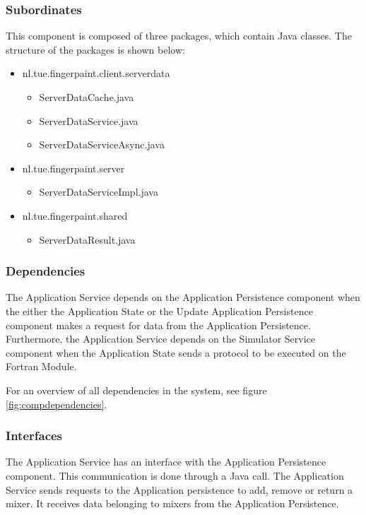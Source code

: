 \subsubsection*{Subordinates}
This component is composed of three packages, which contain Java classes. The structure of the packages is shown below:
\begin{itemize}
	\item nl.tue.fingerpaint.client.serverdata
		\begin{itemize}
			\item ServerDataCache.java
			\item ServerDataService.java
			\item ServerDataServiceAsync.java
		\end{itemize}
	
	\item nl.tue.fingerpaint.server
		\begin{itemize}
			\item ServerDataServiceImpl.java
		\end{itemize}
	
	\item nl.tue.fingerpaint.shared
		\begin{itemize}
			\item ServerDataResult.java
		\end{itemize}
\end{itemize}

\subsubsection*{Dependencies}
The Application Service depends on the Application Persistence component when the either the Application State or the Update Application Persistence component makes a request for data from the Application Persistence. Furthermore, the Application Service depends on the Simulator Service component when the Application State sends a protocol to be executed on the Fortran Module.

\fpstartparagraph{} For an overview of all dependencies in the system, see figure \ref{fig:compdependencies}.

\subsubsection*{Interfaces}
The Application Service has an interface with the Application Persistence component. This communication is done through a Java call. The Application Service sends requests to the Application persistence to add, remove or return a mixer. It receives data belonging to mixers from the Application Persistence.

